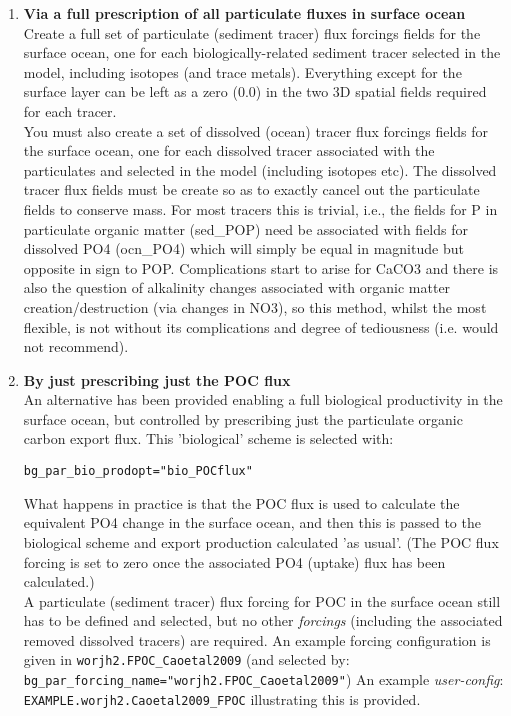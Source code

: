 \documentclass[11pt,fleqn]{book} %
\begin{document}
\begin{enumerate}[noitemsep]

\vspace{1mm}
        \item \textbf{Via a full prescription of all particulate fluxes in surface ocean}
                \\Create a full set of particulate (sediment tracer) flux forcings fields for the surface ocean, one for each biologically-related sediment tracer selected in the model, including isotopes (and trace metals). Everything except for the surface layer can be left as a zero (0.0) in the two 3D spatial fields required for each tracer.
        \\You must also create a set of dissolved (ocean) tracer flux forcings fields for the surface ocean, one for each dissolved tracer associated with the particulates and selected in the model (including isotopes etc). The dissolved tracer flux fields must be create so as to exactly cancel out the particulate fields to conserve mass. For most tracers this is trivial, i.e., the fields for P in particulate organic matter (sed\_POP) need be associated with fields for dissolved PO4 (ocn\_PO4) which will simply be equal in magnitude but opposite in sign to POP. Complications start to arise for CaCO3 and there is also the question of alkalinity changes associated with organic matter creation/destruction (via changes in NO3), so this method, whilst the most flexible, is not without its complications and degree of tediousness (i.e. would not recommend).
        
\vspace{1mm}
        \item \textbf{By just prescribing just the POC flux}
                \\An alternative has been provided enabling a full biological productivity in the surface ocean, but controlled by prescribing just the particulate organic carbon export flux. This 'biological' scheme is selected with:
\vspace{-2.5mm}\begin{verbatim}bg_par_bio_prodopt="bio_POCflux"\end{verbatim}\vspace{-2.5mm}
What happens in practice is that the POC flux is used to calculate the equivalent PO4 change in the surface ocean, and then this is passed to the biological scheme and export production calculated 'as usual'. (The POC flux forcing is set to zero once the associated PO4 (uptake) flux has been calculated.)
                \\A particulate (sediment tracer) flux forcing for POC in the surface ocean still has to be defined and selected, but no other \textit{forcings} (including the associated removed dissolved tracers) are required. An example forcing configuration is given in \texttt{worjh2.FPOC\_Caoetal2009} (and selected by: \texttt{bg\_par\_forcing\_name="worjh2.FPOC\_Caoetal2009"})
An example \textit{user-config}: \texttt{EXAMPLE.worjh2.Caoetal2009\_FPOC} illustrating this is provided.


\end{enumerate}
\end{document}
